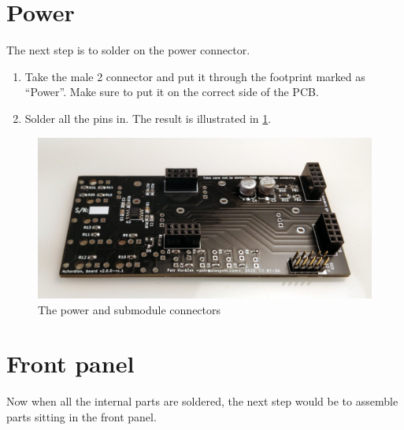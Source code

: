 \documentclass[10pt,a4paper,twocolumn]{article}
\begin{document}
\section{Power}

The next step is to solder on the power connector.

\begin{enumerate}
  \item Take the male 2 connector and put it through the footprint marked as ``Power''. Make sure to put it on the correct side of the PCB.
  \item Solder all the pins in. The result is illustrated in \ref{connectors}.
\end{enumerate}

\begin{figure}[p]
  \centering
  \includegraphics[width=\linewidth]{p03.jpg}
  \caption{The power and submodule connectors}
  \label{connectors}
\end{figure}

\clearpage

\section{Front panel}

Now when all the internal parts are soldered, the next step would be to assemble parts sitting in the front panel.
\end{document}
